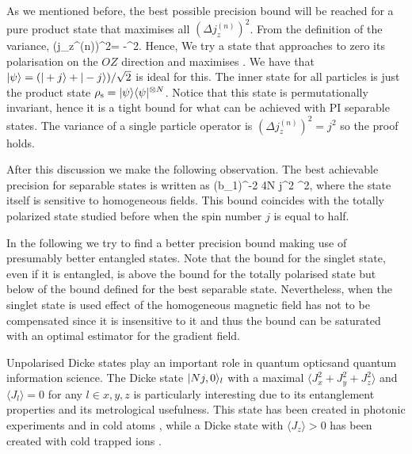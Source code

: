 As we mentioned before, the best possible precision bound will be reached for a pure product state that maximises all $(\Delta j_z^{(n)})^2$.
From the definition of the variance,
\be
(\Delta j_z^{(n)})^2=
-^2.
\ee
Hence, We try a state that approaches to zero its polarisation on the $OZ$ direction and maximises .
We have that  $\vert \psi \rangle=(\vert +j \rangle+\vert -j \rangle)/\sqrt{2}$ is ideal for this.
The inner state for all particles is just the product state $\rho_{\rm s} =\vert \psi \rangle\langle \psi \vert^{\otimes N}$.
Notice that this state is permutationally invariant, hence it is a tight bound for what can be achieved with PI separable states.
The variance of a single particle operator is $(\Delta j_z^{(n)})^2=j^2$ so the proof holds.

After this discussion we make the following observation. The best achievable precision for separable states is written as
\be
(\Delta b_1)^{-2} \leq 4N j^2 \sigma^2,
\label{eq:best_separable}
\ee
where the state itself is sensitive to homogeneous fields.
This bound coincides with the totally polarized state studied before when the spin number $j$ is equal to half.
\label{obs:precision bound for separable states}

In the following we try to find a better precision bound making use of presumably better entangled states.
Note that the bound for the singlet state, even if it is entangled, is above the bound for the totally polarised state but below of the bound defined for the best separable state.
Nevertheless, when the singlet state is used effect of the homogeneous magnetic field has not to be compensated since it is insensitive to it and thus the bound can be saturated with an optimal estimator for the gradient field.


Unpolarised Dicke states play an important role in quantum opticsand quantum information science.
The Dicke state $\vert Nj,0 \rangle_l$ with a maximal $\langle J_x^2+J_y^2+J_z^2 \rangle$ and $\langle J_l\rangle=0$ for any $l\in x,y,z$ is particularly interesting due to its entanglement properties and its metrological usefulness.
This state has been created in photonic experiments \cite{Kiesel2007,Wieczorek2009,Chiuri2012} and in cold atoms \cite{Luecke2011,Hamley2012}, while a Dicke state with $\langle J_z\rangle>0$ has been created with cold trapped ions \cite{haeffner2005}.

